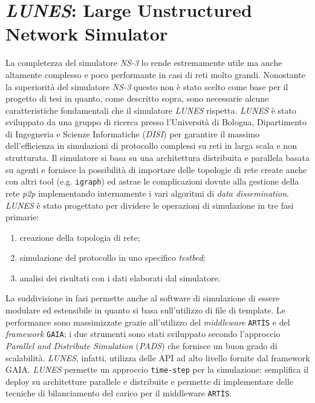 \section{\textit{LUNES}: Large Unstructured Network Simulator}
La completezza del simulatore \textit{NS-3} lo rende estremamente utile ma anche altamente complesso e poco performante in casi di reti molto grandi.\newline
Nonostante la superiorità del simulatore \textit{NS-3} questo non è stato scelto come base per il progetto di tesi in quanto, come descritto sopra, sono necessarie alcune caratteristiche fondamentali che il simulatore \textit{LUNES} rispetta.\newline
\textit{LUNES}\cite{gdalunes} è stato sviluppato da una gruppo di ricerca presso l'Università di Bologna, Dipartimento di Ingegneria e Scienze Informatiche (\textit{DISI}) per garantire il massimo dell'efficienza in simulazioni di protocollo complessi su reti in larga scala e non strutturata.\newline
Il simulatore si basa su una architettura distribuita e parallela basata su agenti e fornisce la possibilità di importare delle topologie di rete create anche con altri tool (e.g. \texttt{igraph}) ed astrae le complicazioni dovute alla gestione della rete \textit{p2p} implementando internamente i vari algoritmi di \textit{data dissemination}. \textit{LUNES} è stato progettato per dividere le operazioni di simulazione in tre fasi primarie:
\begin{enumerate}
    \item creazione della topologia di rete;
    \item simulazione del protocollo in uno specifico \textit{testbed};
    \item analisi dei risultati con i dati elaborati dal simulatore.
\end{enumerate}
La suddivisione in fasi permette anche al software di simulazione di essere modulare ed estensibile in quanto si basa sull'utilizzo di file di template. Le performance sono massimizzate grazie all'utilizzo del \textit{middleware} \texttt{ARTÌS} e del \textit{framework} \texttt{GAIA}; i due strumenti sono stati sviluppato secondo l'approccio \textit{Parallel and Distribute Simulation} (\textit{PADS}) che fornisce un buon grado di scalabilità. \textit{LUNES}, infatti, utilizza delle API ad alto livello fornite dal framework GAIA.
\textit{LUNES} permette un approccio \texttt{time-step} per la simulazione: semplifica il deploy su architetture parallele e distribuite e permette di implementare delle tecniche di bilanciamento del carico per il middleware \texttt{ARTÌS}.
